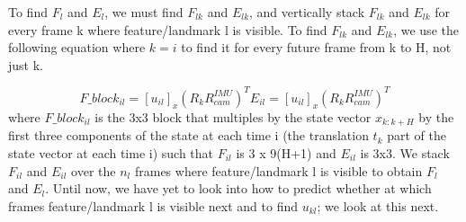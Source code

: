 \documentclass{article}
\begin{document}
To find $F_l$ and $E_l$, we must find $F_{lk}$ and $E_{lk}$, and vertically stack $F_{lk}$ and $E_{lk}$ for every frame k where feature/landmark l is visible. To find 
$F_{lk}$ and $E_{lk}$, we use the following equation where $k = i$ to find it for every future frame from k to H, not just k. 

\begin{equation}
    F\_block_{il} = [u_{il}]_x(R_kR_{cam}^{IMU})^T
    E_{il} = [u_{il}]_x(R_kR_{cam}^{IMU})^T
\end{equation}
where $F\_block_{il}$ is the 3x3 block that multiples by the state vector $x_{k:k+H}$ by the first three components of the state at each time i (the translation $t_k$ part of the state vector at each time i) such that $F_{il}$ is 3 x 9(H+1)  and $E_{il}$ is 3x3. We stack $F_{il}$ and $E_{il}$ over the $n_l$ frames where feature/landmark l is visible to obtain $F_l$ and $E_l$. Until now, we have yet to look into how to predict whether at which frames feature/landmark l is visible next and to find $u_{kl}$; we look at this next. 
\end{document}
